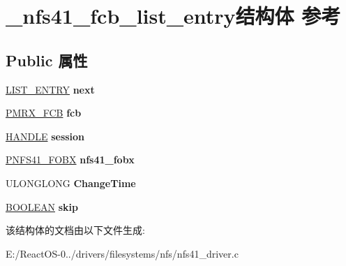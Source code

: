 \hypertarget{struct__nfs41__fcb__list__entry}{}\section{\+\_\+nfs41\+\_\+fcb\+\_\+list\+\_\+entry结构体 参考}
\label{struct__nfs41__fcb__list__entry}
\subsection*{Public 属性}
\begin{DoxyCompactItemize}
\item 
\mbox{\label{struct__nfs41__fcb__list__entry_ab1b6ac71b1f0686e474ca77ba3704e07}} 
\hyperlink{struct___l_i_s_t___e_n_t_r_y}{L\+I\+S\+T\+\_\+\+E\+N\+T\+RY} {\bfseries next}
\item 
\mbox{\label{struct__nfs41__fcb__list__entry_afbadaad6bfa0ce4984ce475086722b5c}} 
\hyperlink{struct___m_r_x___f_c_b__}{P\+M\+R\+X\+\_\+\+F\+CB} {\bfseries fcb}
\item 
\mbox{\label{struct__nfs41__fcb__list__entry_ae49a796d8d4d40c68f9fb3296bb4d7be}} 
\hyperlink{interfacevoid}{H\+A\+N\+D\+LE} {\bfseries session}
\item 
\mbox{\label{struct__nfs41__fcb__list__entry_ad08b6d342463dc9ebbaa392d6b5d9558}} 
\hyperlink{struct___n_f_s41___f_o_b_x}{P\+N\+F\+S41\+\_\+\+F\+O\+BX} {\bfseries nfs41\+\_\+fobx}
\item 
\mbox{\label{struct__nfs41__fcb__list__entry_a8029530cd359569352e43b0d1362bb2e}} 
U\+L\+O\+N\+G\+L\+O\+NG {\bfseries Change\+Time}
\item 
\mbox{\label{struct__nfs41__fcb__list__entry_a6001b0bfacec9aaa8a515bbc4fb264f1}} 
\hyperlink{_processor_bind_8h_a112e3146cb38b6ee95e64d85842e380a}{B\+O\+O\+L\+E\+AN} {\bfseries skip}
\end{DoxyCompactItemize}


该结构体的文档由以下文件生成\+:\begin{DoxyCompactItemize}
\item 
E\+:/\+React\+O\+S-\/0../drivers/filesystems/nfs/nfs41\+\_\+driver.\+c\end{DoxyCompactItemize}
